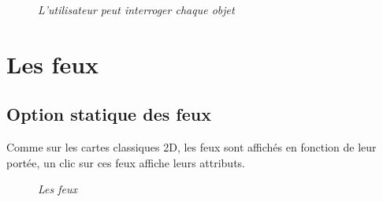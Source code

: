 \begin{center}
\begin{figure}[ht]
\caption{\label{equiProj}\textit{L'utilisateur peut interroger chaque objet}}
\end{figure}
\end{center}


\section{Les feux}
\subsection{Option statique des feux}
Comme sur les cartes classiques 2D, les feux sont affichés en fonction de leur portée, un clic sur ces feux 
affiche leurs attributs.
\begin{center}
\begin{figure}[ht]
\caption{\label{equiProj}\textit{Les feux}}
\end{figure}
\end{center}
